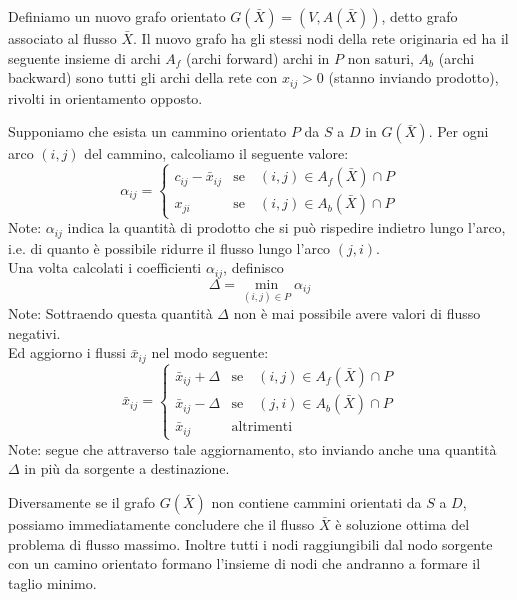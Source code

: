 \documentclass[../template]{subfiles}
\begin{document}
Definiamo un nuovo grafo orientato $G(\bar{X}) = (V, A(\bar{X}))$, detto grafo associato al flusso $\bar{X}$.
Il nuovo grafo ha gli stessi nodi della rete originaria ed ha il seguente insieme di archi
$A_f$ (archi forward) archi in $P$ non saturi, $A_b$ (archi backward) sono tutti gli archi della rete con $x_{ij} > 0$ (stanno inviando prodotto),
rivolti in orientamento opposto.

Supponiamo che esista un cammino orientato $P$ da $S$ a $D$ in $G(\bar{X})$.
Per ogni arco $(i, j)$ del cammino, calcoliamo il seguente valore:
\[
    \alpha_{ij} =
    \begin{cases}
        c_{ij} - \bar{x}_{ij} &\text{se}\quad (i, j) \in A_f (\bar{X}) \cap P\\
        x_{ji}                &\text{se}\quad (i, j) \in A_{b}(\bar{X}) \cap P
    \end{cases}
\]
Note: $\alpha_{ij}$ indica la quantità di prodotto che si può rispedire indietro lungo l'arco, i.e. di quanto è possibile ridurre il flusso lungo l'arco $(j, i)$.
\\
Una volta calcolati i coefficienti $\alpha_{ij}$, definisco
\[
    \Delta = \min_{(i, j) \in P} \alpha_{ij}
\]
Note: Sottraendo questa quantità $\Delta$ non è mai possibile avere valori di flusso negativi.
\\
Ed aggiorno i flussi $\bar{x}_{ij}$ nel modo seguente:
\[
    \bar{x}_{ij} =
    \begin{cases}
        \bar{x}_{ij} + \Delta & \text{se} \quad (i, j) \in A_f(\bar{X}) \cap P \\
        \bar{x}_{ij} - \Delta & \text{se} \quad (j, i) \in A_b(\bar{X}) \cap P\\
        \bar{x}_{ij} & \text{altrimenti}
    \end{cases}
\]
Note: segue che attraverso tale aggiornamento, sto inviando anche una quantità $\Delta$ in più da sorgente a destinazione.

Diversamente se il grafo $G(\bar{X})$ non contiene cammini orientati da $S$ a $D$, possiamo immediatamente concludere che il flusso $\bar{X}$ è soluzione
ottima del problema di flusso massimo.
Inoltre tutti i nodi raggiungibili dal nodo sorgente con un camino orientato formano l'insieme di nodi che andranno a formare il taglio minimo.
\end{document}
